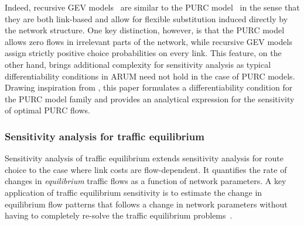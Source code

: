 \documentclass[a4paper,11pt]{article}
\begin{document}
Indeed, recursive GEV models~\citep{fosgerau2013link, mai2015nested, mai2016method,oyama2019prism} are similar to the PURC model~\citep{Fosgerau2021a} in the sense that they are both link-based and allow for flexible substitution induced directly by the network structure. One key distinction, however, is that the PURC model allows zero flows in irrelevant parts of the network, while recursive GEV models assign strictly positive choice probabilities on every link. This feature, on the other hand, brings additional complexity for sensitivity analysis as typical differentiability conditions in ARUM need not hold in the case of PURC models. Drawing inspiration from \cite{kyparisis1990solution,patriksson_sensitivity_2004}, this paper formulates a differentiability condition for the PURC model family and provides an analytical expression for the sensitivity of optimal PURC flows.


\subsubsection{Sensitivity analysis for traffic equilibrium}
Sensitivity analysis of traffic equilibrium extends sensitivity analysis for route choice to the case where link costs are flow-dependent.
It quantifies the rate of changes in \textit{equilibrium} traffic flows as a function of network parameters.
A key application of traffic equilibrium sensitivity is to estimate the change in equilibrium flow patterns that follows a change in network parameters without having to completely re-solve the traffic equilibrium problems~\citep{tobin1988sensitivity, yang1997traffic, patriksson2003sensitivity}.
\end{document}
